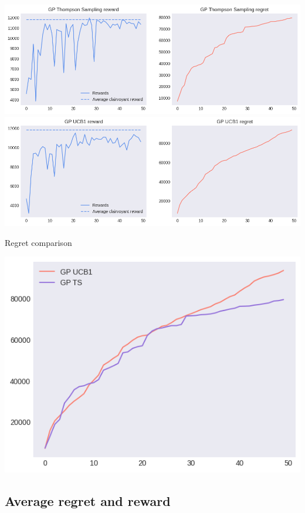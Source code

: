 \begin{center}
	\includegraphics[scale=0.5]{img/Graphs/uncertain_alpha_unit/image1.png}
	\includegraphics[scale=0.5]{img/Graphs/uncertain_alpha_unit/image2.png}
\end{center}

Regret comparison

\begin{center}
	\includegraphics[scale=0.5]{img/Graphs/uncertain_alpha_unit/image3.png}
\end{center}

\subsection{Average regret and reward}

